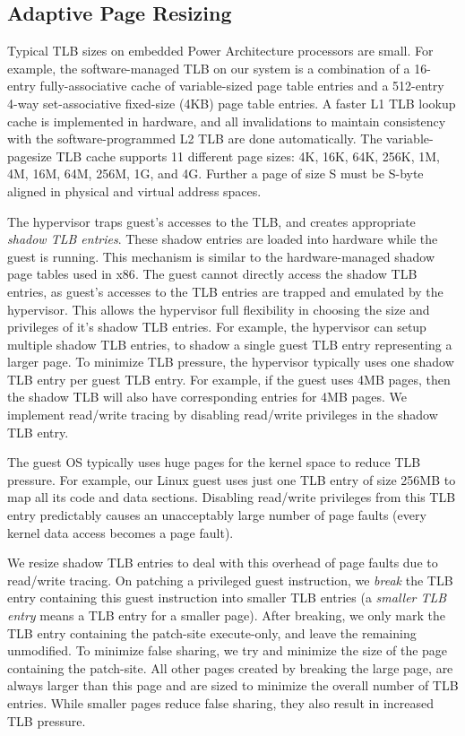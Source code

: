 \documentclass[10pt,twocolumn]{article}
\begin{document}
\subsection{Adaptive Page Resizing}
Typical TLB sizes on embedded Power Architecture processors are small.
For example, the software-managed TLB on our system is a combination of a 16-entry
fully-associative cache of variable-sized page table entries
and a 512-entry 4-way set-associative fixed-size (4KB) page table entries.
A faster L1 TLB lookup cache is implemented in hardware, and all invalidations
to maintain consistency with the software-programmed L2 TLB are done automatically.
The variable-pagesize TLB cache supports 11 different page sizes: 4K, 16K, 64K,
256K, 1M, 4M, 16M, 64M, 256M, 1G, and 4G. Further a page of size S must be S-byte
aligned in physical and virtual address spaces.

The hypervisor traps guest's accesses to the TLB, and creates appropriate
{\em shadow TLB entries}. These shadow entries are loaded into hardware
while the guest is
running. This mechanism is similar to the hardware-managed shadow page
tables used in x86\cite{adams:asplos06}. The guest cannot directly access the shadow
TLB entries, as guest's accesses to the TLB entries are trapped and emulated by
the hypervisor. This allows the hypervisor full flexibility in choosing the
size and privileges of it's shadow TLB entries. For example, the hypervisor
can setup multiple shadow TLB entries, to shadow a single guest TLB entry representing
a larger page.
To minimize TLB pressure, the hypervisor typically uses
one shadow TLB entry per guest TLB entry. For example, if the guest uses 4MB pages,
then the shadow TLB will also have corresponding entries for 4MB pages. We
implement read/write tracing by disabling read/write privileges in the shadow TLB entry.

The guest OS typically uses huge pages for the kernel space to
reduce TLB pressure. For example, our Linux guest
uses just one TLB entry of size 256MB to map all its code and data sections.
Disabling read/write privileges from this TLB entry predictably causes an unacceptably
large number of page faults (every kernel data access becomes a page fault).

We resize shadow TLB entries to deal with this overhead of page faults due to read/write
tracing. On patching a privileged guest instruction, we {\em break} the TLB entry
containing this guest instruction into smaller TLB entries
(a {\em smaller TLB entry} means a TLB entry for a smaller page). After breaking,
we only mark the
TLB entry containing the patch-site execute-only, and leave the remaining
unmodified.
To minimize false sharing, we try and minimize the
size of the page containing the patch-site. All other pages created by
breaking the large page, are always larger than this page and are sized
to minimize
the overall number of TLB entries. While smaller pages reduce false sharing, they
also result in increased TLB pressure.
\end{document}
